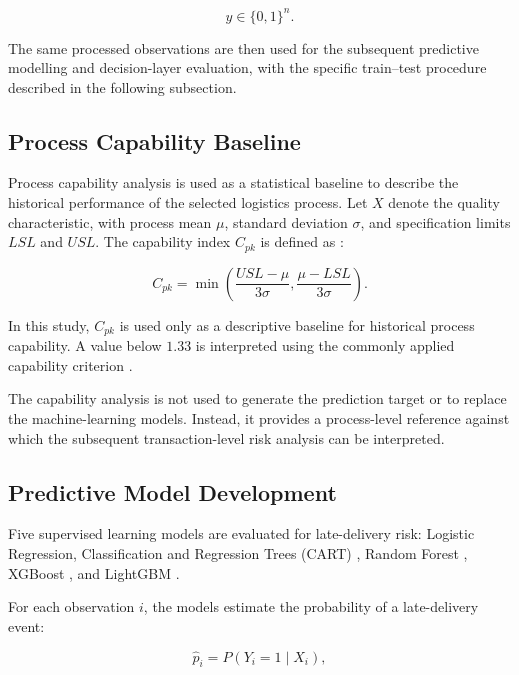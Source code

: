 \documentclass[10pt,a4paper]{article}
\begin{document}
\begin{equation}
y \in \{0,1\}^{n}.
\end{equation}

The same processed observations are then used for the subsequent
predictive modelling and decision-layer evaluation, with the specific
train--test procedure described in the following subsection.
\subsection{Process Capability Baseline}

Process capability analysis is used as a statistical baseline to
describe the historical performance of the selected logistics process.
Let $X$ denote the quality characteristic, with process mean $\mu$,
standard deviation $\sigma$, and specification limits $LSL$ and $USL$.
The capability index $C_{pk}$ is defined as
\cite{montgomery2019introduction}:

\begin{equation}
C_{pk} =
\min\left(
\frac{USL-\mu}{3\sigma},
\frac{\mu-LSL}{3\sigma}
\right).
\end{equation}

In this study, $C_{pk}$ is used only as a descriptive baseline for
historical process capability. A value below $1.33$ is interpreted using
the commonly applied capability criterion
\cite{montgomery2019introduction}.

The capability analysis is not used to generate the prediction target
or to replace the machine-learning models. Instead, it provides a
process-level reference against which the subsequent transaction-level
risk analysis can be interpreted.

\subsection{Predictive Model Development}

Five supervised learning models are evaluated for late-delivery risk:
Logistic Regression, Classification and Regression Trees (CART)
\cite{breiman1984classification}, Random Forest
\cite{breiman2001random}, XGBoost \cite{chen2016xgboost}, and LightGBM
\cite{ke2017lightgbm}.

For each observation $i$, the models estimate the probability of a
late-delivery event:

\begin{equation}
\hat{p}_i = P(Y_i=1\mid X_i),
\label{eq:prediction_probability}
\end{equation}
\end{document}
